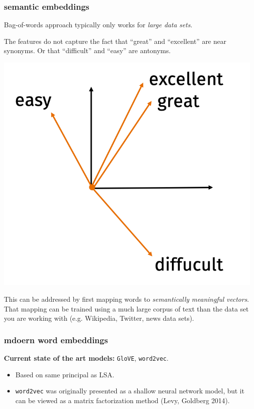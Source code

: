 \documentclass[handout,compress]{beamer}
\begin{document}
\begin{frame}
	\frametitle{semantic embeddings}
	\small
	\begin{center}
		Bag-of-words approach typically only works for \emph{large data sets}. 
	\end{center}
	The features do not capture the fact that ``great'' and ``excellent'' are near synonyms. Or that ``difficult'' and ``easy'' are antonyms.
	
	\begin{center}
		\includegraphics[width=.3\textwidth]{semantic_embedding.png}
	\end{center}
	This can be addressed by first mapping words to \emph{semantically meaningful vectors}. That mapping can be trained using a much large corpus of text than the data set you are working with (e.g. Wikipedia, Twitter, news data sets). 	
\end{frame}


\begin{frame}
	\frametitle{mdoern word embeddings}
	\textbf{Current state of the art models:} \texttt{GloVE}, \texttt{word2vec}.
	\begin{itemize}
		\item Based on same principal as LSA. 
		\item \texttt{word2vec} was originally presented as a shallow neural network model, but it can be viewed as a matrix factorization method (Levy, Goldberg 2014).
	\end{itemize}
\end{frame}
\end{document}
